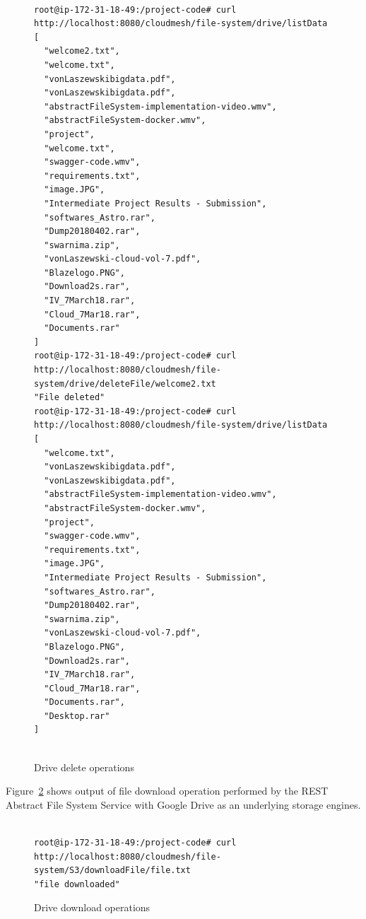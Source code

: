 \begin{figure}[!ht]
\begin{footnotesize}
\begin{verbatim}

root@ip-172-31-18-49:/project-code# curl 
http://localhost:8080/cloudmesh/file-system/drive/listData
[
  "welcome2.txt",
  "welcome.txt",
  "vonLaszewskibigdata.pdf",
  "vonLaszewskibigdata.pdf",
  "abstractFileSystem-implementation-video.wmv",
  "abstractFileSystem-docker.wmv",
  "project",
  "welcome.txt",
  "swagger-code.wmv",
  "requirements.txt",
  "image.JPG",
  "Intermediate Project Results - Submission",
  "softwares_Astro.rar",
  "Dump20180402.rar",
  "swarnima.zip",
  "vonLaszewski-cloud-vol-7.pdf",
  "Blazelogo.PNG",
  "Download2s.rar",
  "IV_7March18.rar",
  "Cloud_7Mar18.rar",
  "Documents.rar"
]
root@ip-172-31-18-49:/project-code# curl 
http://localhost:8080/cloudmesh/file-system/drive/deleteFile/welcome2.txt
"File deleted"
root@ip-172-31-18-49:/project-code# curl 
http://localhost:8080/cloudmesh/file-system/drive/listData
[
  "welcome.txt",
  "vonLaszewskibigdata.pdf",
  "vonLaszewskibigdata.pdf",
  "abstractFileSystem-implementation-video.wmv",
  "abstractFileSystem-docker.wmv",
  "project",
  "swagger-code.wmv",
  "requirements.txt",
  "image.JPG",
  "Intermediate Project Results - Submission",
  "softwares_Astro.rar",
  "Dump20180402.rar",
  "swarnima.zip",
  "vonLaszewski-cloud-vol-7.pdf",
  "Blazelogo.PNG",
  "Download2s.rar",
  "IV_7March18.rar",
  "Cloud_7Mar18.rar",
  "Documents.rar",
  "Desktop.rar"
]


\end{verbatim}
\end{footnotesize}
\caption{Drive delete operations}\label{fig:drive-delete}
\end{figure}


Figure~\ref{fig:drive-download} shows output of file download
operation performed by the REST Abstract File System Service with
Google Drive as an underlying storage engines.

\begin{figure}[!ht]
\begin{footnotesize}
\begin{verbatim}

root@ip-172-31-18-49:/project-code# curl 
http://localhost:8080/cloudmesh/file-system/S3/downloadFile/file.txt
"file downloaded"

\end{verbatim}
\end{footnotesize}
\caption{Drive download operations}\label{fig:drive-download}
\end{figure}


